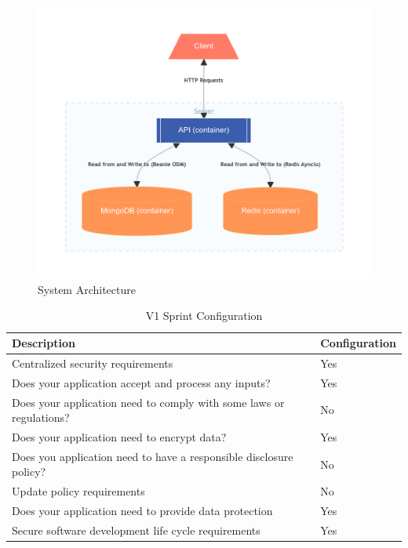 \begin{figure}
    \centering
    \caption{System Architecture}
    \label{fig:sys-arch}
    \includegraphics[width=\textwidth]{../../img/chapter-4/system-arch.png}
\end{figure}

\begin{table}
    \centering
    \caption{V1 Sprint Configuration}
    \label{tab:arch-design-config}
    \begin{tabulary}{1.0\textwidth}{|L|L|}
        \hline
        \textbf{Description} & \textbf{Configuration} \\
        \hline
        Centralized security requirements & Yes \\
        \hline
        Does your application accept and process any inputs? & Yes \\
        \hline
        Does your application need to comply with some laws or regulations? & No \\
        \hline
        Does your application need to encrypt data? & Yes \\
        \hline
        Does you application need to have a responsible disclosure policy? & No \\
        \hline
        Update policy requirements & No \\
        \hline
        Does your application need to provide data protection & Yes \\
        \hline
        Secure software development life cycle requirements & Yes \\
        \hline
    \end{tabulary}
\end{table}

